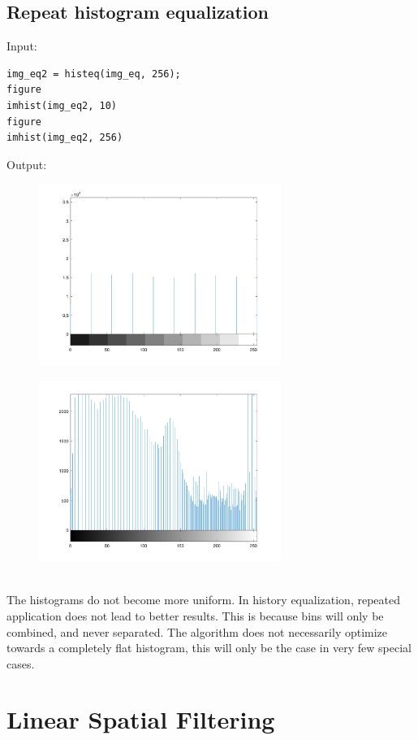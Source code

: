 \documentclass[12pt, a4paper]{article}
\begin{document}
\subsection{Repeat histogram equalization}
Input:
\begin{verbatim}
img_eq2 = histeq(img_eq, 256);
figure
imhist(img_eq2, 10)
figure
imhist(img_eq2, 256)
\end{verbatim}
\newpage
Output:
\begin{figure}[H]
    \centering
    \includegraphics[width=0.7\textwidth]{fig5.png}
\end{figure}
\begin{figure}[H]
    \centering
    \includegraphics[width=0.7\textwidth]{fig6.png}
\end{figure}
~\\
The histograms do not become more uniform. In history equalization, repeated application does not lead to better results. This is because bins will only be combined, and never separated. The algorithm does not necessarily optimize towards a completely flat histogram, this will only be the case in very few special cases.

\section{Linear Spatial Filtering}
\end{document}

